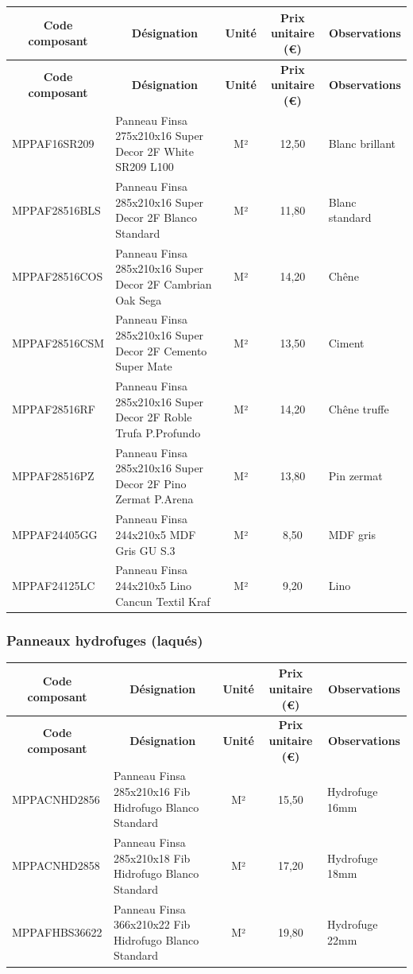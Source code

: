\documentclass[12pt,a4paper]{article}
\begin{document}
\begin{longtable}{|p{4cm}|p{6cm}|c|c|p{3cm}|}
\hline
\multicolumn{1}{|c|}{\textbf{Code composant}} & \multicolumn{1}{c|}{\textbf{Désignation}} & \multicolumn{1}{c|}{\textbf{Unité}} & \multicolumn{1}{c|}{\textbf{Prix unitaire (€)}} & \multicolumn{1}{c|}{\textbf{Observations}} \\
\hline
\endfirsthead
\hline
\multicolumn{1}{|c|}{\textbf{Code composant}} & \multicolumn{1}{c|}{\textbf{Désignation}} & \multicolumn{1}{c|}{\textbf{Unité}} & \multicolumn{1}{c|}{\textbf{Prix unitaire (€)}} & \multicolumn{1}{c|}{\textbf{Observations}} \\
\hline
\endhead
\hline
\endfoot
MPPAF16SR209 & Panneau Finsa 275x210x16 Super Decor 2F White SR209 L100 & M² & 12,50 & Blanc brillant \\
MPPAF28516BLS & Panneau Finsa 285x210x16 Super Decor 2F Blanco Standard & M² & 11,80 & Blanc standard \\
MPPAF28516COS & Panneau Finsa 285x210x16 Super Decor 2F Cambrian Oak Sega & M² & 14,20 & Chêne \\
MPPAF28516CSM & Panneau Finsa 285x210x16 Super Decor 2F Cemento Super Mate & M² & 13,50 & Ciment \\
MPPAF28516RF & Panneau Finsa 285x210x16 Super Decor 2F Roble Trufa P.Profundo & M² & 14,20 & Chêne truffe \\
MPPAF28516PZ & Panneau Finsa 285x210x16 Super Decor 2F Pino Zermat P.Arena & M² & 13,80 & Pin zermat \\
MPPAF24405GG & Panneau Finsa 244x210x5 MDF Gris GU S.3 & M² & 8,50 & MDF gris \\
MPPAF24125LC & Panneau Finsa 244x210x5 Lino Cancun Textil Kraf & M² & 9,20 & Lino \\
\hline
\end{longtable}

\subsubsection{Panneaux hydrofuges (laqués)}

\begin{longtable}{|p{4cm}|p{6cm}|c|c|p{3cm}|}
\hline
\multicolumn{1}{|c|}{\textbf{Code composant}} & \multicolumn{1}{c|}{\textbf{Désignation}} & \multicolumn{1}{c|}{\textbf{Unité}} & \multicolumn{1}{c|}{\textbf{Prix unitaire (€)}} & \multicolumn{1}{c|}{\textbf{Observations}} \\
\hline
\endfirsthead
\hline
\multicolumn{1}{|c|}{\textbf{Code composant}} & \multicolumn{1}{c|}{\textbf{Désignation}} & \multicolumn{1}{c|}{\textbf{Unité}} & \multicolumn{1}{c|}{\textbf{Prix unitaire (€)}} & \multicolumn{1}{c|}{\textbf{Observations}} \\
\hline
\endhead
\hline
\endfoot
MPPACNHD2856 & Panneau Finsa 285x210x16 Fib Hidrofugo Blanco Standard & M² & 15,50 & Hydrofuge 16mm \\
MPPACNHD2858 & Panneau Finsa 285x210x18 Fib Hidrofugo Blanco Standard & M² & 17,20 & Hydrofuge 18mm \\
MPPAFHBS36622 & Panneau Finsa 366x210x22 Fib Hidrofugo Blanco Standard & M² & 19,80 & Hydrofuge 22mm \\
\hline
\end{longtable}
\end{document}
